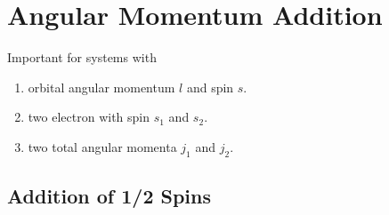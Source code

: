\chapter{Angular Momentum Addition}

Important for systems with 
\begin{enumerate}
    \item orbital angular momentum $l$ and spin $s$. 
    \item two electron with spin $s_1$ and $s_2$.
    \item two total angular momenta $j_1$ and $j_2$.
\end{enumerate}

\section{Addition of 1/2 Spins}



